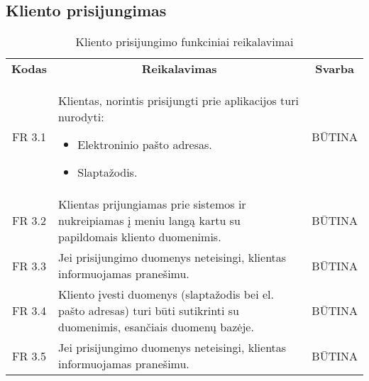 \documentclass{VUMIFPSkursinis}
\begin{document}
\subsection{Kliento prisijungimas}

\begin{center}
	\begin{table}[H]
	\begin{tabular}{|p{2cm}|p{}|p{}|}
	\hline
	    \rowcolor{lightgray}
		\multicolumn{3}{|c|}{Kliento prisijungimas}\\
		
	\hline
		\multicolumn{1}{|c|}{{\bfseries Kodas}}&
		\multicolumn{1}{|c|}{{\bfseries Reikalavimas}}&
		\multicolumn{1}{|c|}{{\bfseries Svarba}}\\

	\hline
	
		\multicolumn{1}{|c|}{FR 3.1}&
		{Klientas, norintis prisijungti prie aplikacijos turi nurodyti:
			\begin{itemize}
				\item Elektroninio pašto adresas.
				\item Slaptažodis.
			\end{itemize}
		}&
		\multicolumn{1}{|c|}{BŪTINA}\\	
		
	\hline	
		\multicolumn{1}{|c|}{FR 3.2}&
		{Klientas prijungiamas prie sistemos ir nukreipiamas į meniu langą kartu su papildomais kliento duomenimis.}&
		\multicolumn{1}{|c|}{BŪTINA}\\
		
	\hline	
		\multicolumn{1}{|c|}{FR 3.3}&
		{Jei prisijungimo duomenys neteisingi, klientas informuojamas pranešimu.}&
		\multicolumn{1}{|c|}{BŪTINA}\\		
		
	\hline
		\multicolumn{1}{|c|}{FR 3.4}&
		{Kliento įvesti duomenys (slaptažodis bei el. pašto adresas) turi būti sutikrinti su duomenimis, esančiais duomenų bazėje.}&
		\multicolumn{1}{|c|}{BŪTINA}\\
		
	\hline	
		\multicolumn{1}{|c|}{FR 3.5}&
		{Jei prisijungimo duomenys neteisingi, klientas informuojamas pranešimu.}&
		\multicolumn{1}{|c|}{BŪTINA}\\
	\hline
	
	
	
	\end{tabular}	
	\caption{Kliento prisijungimo funkciniai reikalavimai}
	\label{table:VartotojoPrisijungimas}		
	\end{table}

\end{center}
\pagebreak
\end{document}
